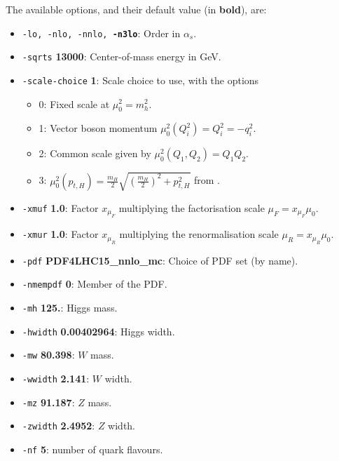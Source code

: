 \documentclass[12pt,a4]{article}
\begin{document}
The available options, and their default value (in {\bf bold}), are:
\begin{itemize}
\item\texttt{-lo, -nlo, -nnlo, {\bf -n3lo}}: Order in $\alpha_s$.
  
\item\texttt{-sqrts} {\bf 13000}: Center-of-mass energy in GeV.

\item\texttt{-scale-choice} {\bf 1}: Scale choice to use, with the options
  \begin{itemize}
  \item 0: Fixed scale at $\mu_0^2=m^2_h$.
  \item 1: Vector boson momentum $\mu_0^2(Q_i^2)=Q^2_i=-q_i^2$.
  \item 2: Common scale given by $\mu_0^2(Q_1, Q_2)=Q_1 Q_2$.
  \item 3: 
    $\mu_0^2(p_{t,H}) = \frac{m_H}{2} \sqrt{\left(\frac{m_H}{2}\right)^2
      + p_{t,H}^2}$ from \cite{Cacciari:2015jma}.
  \end{itemize}

\item\texttt{-xmuf} {\bf 1.0}: Factor $x_{\mu_F}$ multiplying the
  factorisation scale $\mu_F = x_{\mu_F} \mu_0$.

\item\texttt{-xmur} {\bf 1.0}: Factor $x_{\mu_R}$ multiplying the
  renormalisation scale $\mu_R = x_{\mu_R} \mu_0$.

\item\texttt{-pdf} {\bf PDF4LHC15\_nnlo\_mc}: Choice of PDF set (by name).

\item\texttt{-nmempdf} {\bf 0}: Member of the PDF.

\item\texttt{-mh} {\bf 125.}: Higgs mass.

\item\texttt{-hwidth} {\bf 0.00402964}: Higgs width.
  
\item\texttt{-mw} {\bf 80.398}: $W$ mass.

\item\texttt{-wwidth} {\bf 2.141}: $W$ width.

\item\texttt{-mz} {\bf 91.187}: $Z$ mass.

\item\texttt{-zwidth} {\bf 2.4952}: $Z$ width.

\item\texttt{-nf} {\bf 5}: number of quark flavours.
  

\end{itemize}
\end{document}
